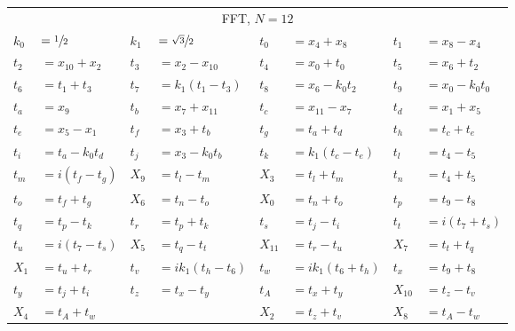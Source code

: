 \begin{tabular}{|p{4.3pt}l|p{4.3pt}l|p{4.3pt}l|p{4.3pt}l|}\toprule \multicolumn{8}{|c|}{FFT, $N=12$} \\
$k_0 $ &$= \sfrac{1}{2}$ & $k_1 $ &$= \sfrac{\sqrt{3}}{2}$ & $t_0 $ &$= x_4 + x_8$ & $t_1 $ &$= x_8 - x_4$\\ 
$t_2 $ &$= x_{10} + x_2$ & $t_3 $ &$= x_2 - x_{10}$ & $t_4 $ &$= x_0 + t_0$ & $t_5 $ &$= x_6 + t_2$\\ 
$t_6 $ &$= t_1 + t_3$ & $t_7 $ &$= k_1(t_1 - t_3)$ & $t_8 $ &$= x_6 - k_0t_2$ & $t_9 $ &$= x_0 - k_0t_0$\\ 
$t_a $ &$= x_9$ & $t_b $ &$= x_7 + x_{11}$ & $t_c $ &$= x_{11} - x_7$ & $t_d $ &$= x_1 + x_5$\\ 
$t_e $ &$= x_5 - x_1$ & $t_f $ &$= x_3 + t_b$ & $t_g $ &$= t_a + t_d$ & $t_h $ &$= t_c + t_e$\\ 
$t_i $ &$= t_a - k_0t_d$ & $t_j $ &$= x_3 - k_0t_b$ & $t_k $ &$= k_1(t_c - t_e)$ & $t_l $ &$= t_4 - t_5$\\ 
$t_m $ &$= i(t_f - t_g)$ & $X_9 $ &$= t_l - t_m$ & $X_3 $ &$= t_l + t_m$ & $t_n $ &$= t_4 + t_5$\\ 
$t_o $ &$= t_f + t_g$ & $X_6 $ &$= t_n - t_o$ & $X_0 $ &$= t_n + t_o$ & $t_p $ &$= t_9 - t_8$\\ 
$t_q $ &$= t_p - t_k$ & $t_r $ &$= t_p + t_k$ & $t_s $ &$= t_j - t_i$ & $t_t $ &$= i(t_7 + t_s)$\\ 
$t_u $ &$= i(t_7 - t_s)$ & $X_5 $ &$= t_q - t_t$ & $X_{11} $ &$= t_r - t_u$ & $X_7 $ &$= t_t + t_q$\\ 
$X_1 $ &$= t_u + t_r$ & $t_v $ &$= ik_1(t_h - t_6)$ & $t_w $ &$= ik_1(t_6 + t_h)$ & $t_x $ &$= t_9 + t_8$\\ 
$t_y $ &$= t_j + t_i$ & $t_z $ &$= t_x - t_y$ & $t_A $ &$= t_x + t_y$ & $X_{10} $ &$= t_z - t_v$\\ 
$X_4 $ &\multicolumn{3}{l|}{$= t_A + t_w$} & $X_2 $ &$= t_z + t_v$ & $X_8 $ &$= t_A - t_w$\\ 
\bottomrule\end{tabular}
